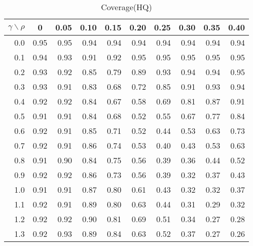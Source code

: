 \documentclass[12pt]{article}
\begin{document}
%
\begin{table}[!tbp]
\caption{Coverage(HQ)}
 \begin{center}
 \begin{tabular}{r|rrrrrrrrr}\hline\hline
\multicolumn{1}{c|}{$\gamma\backslash\rho$}&\multicolumn{1}{c}{0}&\multicolumn{1}{c}{0.05}&\multicolumn{1}{c}{0.10}&\multicolumn{1}{c}{0.15}&\multicolumn{1}{c}{0.20}&\multicolumn{1}{c}{0.25}&\multicolumn{1}{c}{0.30}&\multicolumn{1}{c}{0.35}&\multicolumn{1}{c}{0.40}\tabularnewline
\hline

0.0&0.95&0.95&0.94&0.94&0.94&0.94&0.94&0.94&0.94\tabularnewline
0.1&0.94&0.93&0.91&0.92&0.95&0.95&0.95&0.95&0.95\tabularnewline
0.2&0.93&0.92&0.85&0.79&0.89&0.93&0.94&0.94&0.95\tabularnewline
0.3&0.93&0.91&0.83&0.68&0.72&0.85&0.91&0.93&0.94\tabularnewline
0.4&0.92&0.92&0.84&0.67&0.58&0.69&0.81&0.87&0.91\tabularnewline
0.5&0.91&0.91&0.84&0.68&0.52&0.55&0.67&0.77&0.84\tabularnewline
0.6&0.92&0.91&0.85&0.71&0.52&0.44&0.53&0.63&0.73\tabularnewline
0.7&0.92&0.91&0.86&0.74&0.53&0.40&0.43&0.53&0.63\tabularnewline
0.8&0.91&0.90&0.84&0.75&0.56&0.39&0.36&0.44&0.52\tabularnewline
0.9&0.92&0.92&0.86&0.73&0.56&0.39&0.32&0.37&0.43\tabularnewline
1.0&0.91&0.91&0.87&0.80&0.61&0.43&0.32&0.32&0.37\tabularnewline
1.1&0.92&0.91&0.89&0.80&0.63&0.44&0.31&0.29&0.32\tabularnewline
1.2&0.92&0.92&0.90&0.81&0.69&0.51&0.34&0.27&0.28\tabularnewline
1.3&0.92&0.93&0.89&0.84&0.63&0.52&0.37&0.27&0.26\tabularnewline
\hline
\end{tabular}

\end{center}

\end{table}
\end{document}
